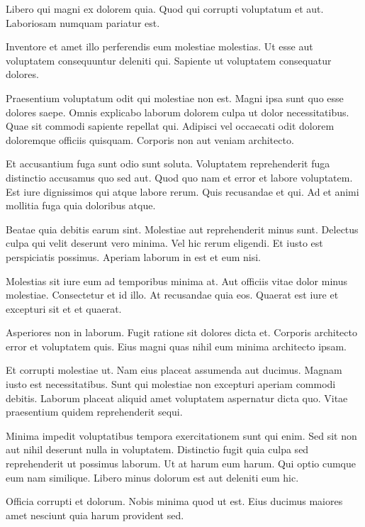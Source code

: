\documentclass[a4paper]{article}
\begin{document}
\begin{multicols}{2}

Libero qui magni ex dolorem quia. Quod qui corrupti voluptatum et aut.
    Laboriosam numquam pariatur est.

Inventore et amet illo perferendis eum molestiae molestias. Ut esse aut
    voluptatem consequuntur deleniti qui. Sapiente ut voluptatem consequatur
    dolores.

Praesentium voluptatum odit qui molestiae non est. Magni ipsa sunt quo esse
    dolores saepe. Omnis explicabo laborum dolorem culpa ut dolor
    necessitatibus. Quae sit commodi sapiente repellat qui. Adipisci vel
    occaecati odit dolorem doloremque officiis quisquam. Corporis non aut veniam
    architecto.

Et accusantium fuga sunt odio sunt soluta. Voluptatem reprehenderit fuga
    distinctio accusamus quo sed aut. Quod quo nam et error et labore
    voluptatem. Est iure dignissimos qui atque labore rerum. Quis recusandae et
    qui. Ad et animi mollitia fuga quia doloribus atque.

Beatae quia debitis earum sint. Molestiae aut reprehenderit minus sunt. Delectus
    culpa qui velit deserunt vero minima. Vel hic rerum eligendi. Et iusto est
    perspiciatis possimus. Aperiam laborum in est et eum nisi.

Molestias sit iure eum ad temporibus minima at. Aut officiis vitae dolor minus
    molestiae. Consectetur et id illo. At recusandae quia eos. Quaerat est iure
    et excepturi sit et et quaerat.

Asperiores non in laborum. Fugit ratione sit dolores dicta et. Corporis
    architecto error et voluptatem quis. Eius magni quas nihil eum minima
    architecto ipsam.

Et corrupti molestiae ut. Nam eius placeat assumenda aut ducimus. Magnam iusto
    est necessitatibus. Sunt qui molestiae non excepturi aperiam commodi
    debitis. Laborum placeat aliquid amet voluptatem aspernatur dicta quo. Vitae
    praesentium quidem reprehenderit sequi.

Minima impedit voluptatibus tempora exercitationem sunt qui enim. Sed sit non
    aut nihil deserunt nulla in voluptatem. Distinctio fugit quia culpa sed
    reprehenderit ut possimus laborum. Ut at harum eum harum. Qui optio cumque
    eum nam similique. Libero minus dolorum est aut deleniti eum hic.

Officia corrupti et dolorum. Nobis minima quod ut est. Eius ducimus maiores amet
    nesciunt quia harum provident sed.


\end{multicols}
\end{document}
